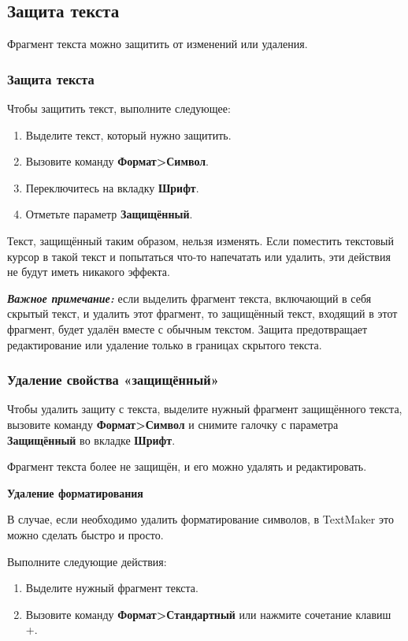 \documentclass[a4paper,10pt]{article}
\begin{document}
\subsection{Защита текста}
Фрагмент текста можно защитить от изменений или удаления.
\subsubsection{Защита текста}
Чтобы защитить текст, выполните следующее:
\begin{enumerate}
 \item Выделите текст, который нужно защитить.
 \item Вызовите команду \textbf{Формат>Символ}.
 \item Переключитесь на вкладку \textbf{Шрифт}.
 \item Отметьте параметр \textbf{Защищённый}.
\end{enumerate}
Текст, защищённый таким образом, нельзя изменять. Если поместить текстовый курсор в такой текст и попытаться что-то напечатать или удалить, эти действия не будут иметь никакого эффекта.

\begin{mdframed}[backgroundcolor=blue!10]
\textbf{\textit{Важное примечание:}} если выделить фрагмент текста, включающий в себя скрытый текст, и удалить этот фрагмент, то защищённый текст, входящий в этот фрагмент, будет удалён вместе с обычным текстом. Защита предотвращает редактирование или удаление только в границах скрытого текста.
\end{mdframed}

\subsubsection{Удаление свойства «защищённый»} 
Чтобы удалить защиту с текста, выделите нужный фрагмент защищённого текста, вызовите команду \textbf{Формат>Символ} и снимите галочку с параметра \textbf{Защищённый} во вкладке \textbf{Шрифт}.

Фрагмент текста более не защищён, и его можно удалять и редактировать.

\textbf{Удаление форматирования}

В случае, если необходимо удалить форматирование символов, в TextMaker это можно сделать быстро и просто.

Выполните следующие действия:
\begin{enumerate}
 \item Выделите нужный фрагмент текста.
 \item Вызовите команду \textbf{Формат>Стандартный} или нажмите сочетание клавиш +.
\end{enumerate}
\end{document}
